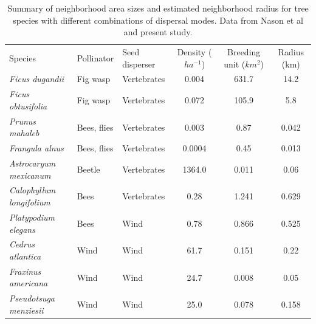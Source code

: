 \documentclass[a4paper, 12pt]{article}}
\begin{document}
\begin{landscape}
\begin{table}
  \caption{Summary of neighborhood area sizes and estimated neighborhood radius for tree species with different combinations of dispersal modes. Data from Nason et al and present study. }
    \begin{tabular}{lllccc}
     Species                & Pollinator  & Seed disperser & Density ($ha^{-1}$) & Breeding unit ($km^2$) & Radius (km) \\
    \textit{Ficus dugandii}          & Fig wasp    & Vertebrates    & 0.004          & 631.7               & 14.2        \\
    \textit{Ficus obtusifolia}       & Fig wasp    & Vertebrates    & 0.072          & 105.9               & 5.8         \\
    \textit{Prunus mahaleb}          & Bees, flies & Vertebrates    & 0.003          & 0.87                & 0.042       \\
    \textit{Frangula alnus}          & Bees, flies & Vertebrates    & 0.0004         & 0.45                & 0.013       \\
    \textit{Astrocaryum mexicanum}   & Beetle      & Vertebrates    & 1364.0         & 0.011               & 0.06        \\
    \textit{Calophyllum longifolium} & Bees        & Vertebrates    & 0.28           & 1.241               & 0.629       \\
    \textit{Platypodium elegans}     & Bees        & Wind           & 0.78           & 0.866               & 0.525       \\
    \textit{Cedrus atlantica}        & Wind        & Wind           & 61.7           & 0.151               & 0.22        \\
   \textit{Fraxinus americana}      & Wind        & Wind           & 24.7           & 0.008               & 0.05        \\
    \textit{Pseudotsuga menziesii}   & Wind        & Wind           & 25.0           & 0.078               & 0.158       \\
    \end{tabular}
\end{table}
\end{landscape}
\newpage 
\end{document}
